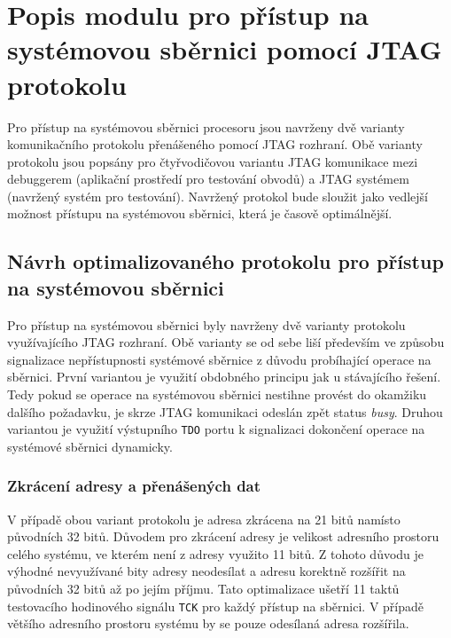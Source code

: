 \chapter{Popis modulu pro přístup na systémovou sběrnici pomocí JTAG protokolu}	\label{jtag_ap}
Pro přístup na systémovou sběrnici procesoru jsou navrženy dvě varianty komunikačního protokolu přenášeného pomocí JTAG rozhraní. Obě varianty protokolu jsou popsány pro čtyřvodičovou variantu \acs{JTAG} komunikace mezi debuggerem (aplikační prostředí pro testování obvodů) a \acs{JTAG} systémem (navržený systém pro testování). Navržený protokol bude sloužit jako vedlejší možnost přístupu na systémovou sběrnici, která je časově optimálnější.

\section{Návrh optimalizovaného protokolu pro přístup na systémovou sběrnici}	\label{sec:protokoly}
Pro přístup na systémovou sběrnici byly navrženy dvě varianty protokolu využívajícího JTAG rozhraní. Obě varianty se od sebe liší především ve způsobu signalizace nepřístupnosti systémové sběrnice z důvodu probíhající operace na sběrnici. První variantou je využití obdobného principu jak u stávajícího řešení. Tedy pokud se operace na systémovou sběrnici nestihne provést do okamžiku dalšího požadavku, je skrze JTAG komunikaci odeslán zpět status \textit{busy}. Druhou variantou je využití výstupního \texttt{\acs{TDO}} portu k signalizaci dokončení operace na systémové sběrnici dynamicky.

\subsection{Zkrácení adresy a přenášených dat}
V případě obou variant protokolu je adresa zkrácena na 21 bitů namísto původních 32 bitů. Důvodem pro zkrácení adresy je velikost adresního prostoru celého systému, ve kterém není z adresy využito 11 bitů. Z tohoto důvodu je výhodné nevyužívané bity adresy neodesílat a adresu korektně rozšířit na původních 32 bitů až po jejím příjmu. Tato optimalizace ušetří 11 taktů testovacího hodinového signálu \texttt{\acs{TCK}} pro každý přístup na sběrnici. V případě většího adresního prostoru systému by se pouze odesílaná adresa rozšířila.

